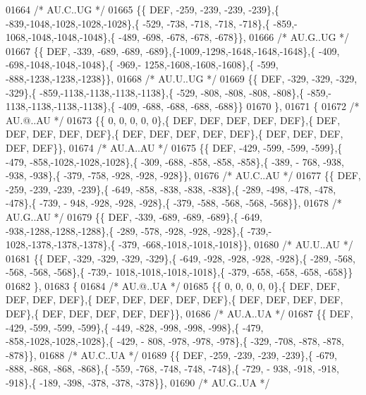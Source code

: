 \begin{DoxyCode}
01664 \textcolor{comment}{/* AU.C..UG */}
01665 \{\{  DEF, -259, -239, -239, -239\},\{ -839,-1048,-1028,-1028,-1028\},\{ -529, -738, -718, -718, -718\},\{ -859,-
      1068,-1048,-1048,-1048\},\{ -489, -698, -678, -678, -678\}\},
01666 \textcolor{comment}{/* AU.G..UG */}
01667 \{\{  DEF, -339, -689, -689, -689\},\{-1009,-1298,-1648,-1648,-1648\},\{ -409, -698,-1048,-1048,-1048\},\{ -969,-
      1258,-1608,-1608,-1608\},\{ -599, -888,-1238,-1238,-1238\}\},
01668 \textcolor{comment}{/* AU.U..UG */}
01669 \{\{  DEF, -329, -329, -329, -329\},\{ -859,-1138,-1138,-1138,-1138\},\{ -529, -808, -808, -808, -808\},\{ -859,-
      1138,-1138,-1138,-1138\},\{ -409, -688, -688, -688, -688\}\}
01670 \},
01671 \{
01672 \textcolor{comment}{/* AU.@..AU */}
01673 \{\{    0,    0,    0,    0,    0\},\{  DEF,  DEF,  DEF,  DEF,  DEF\},\{  DEF,  DEF,  DEF,  DEF,  DEF\},\{  DEF,  
      DEF,  DEF,  DEF,  DEF\},\{  DEF,  DEF,  DEF,  DEF,  DEF\}\},
01674 \textcolor{comment}{/* AU.A..AU */}
01675 \{\{  DEF, -429, -599, -599, -599\},\{ -479, -858,-1028,-1028,-1028\},\{ -309, -688, -858, -858, -858\},\{ -389, -
      768, -938, -938, -938\},\{ -379, -758, -928, -928, -928\}\},
01676 \textcolor{comment}{/* AU.C..AU */}
01677 \{\{  DEF, -259, -239, -239, -239\},\{ -649, -858, -838, -838, -838\},\{ -289, -498, -478, -478, -478\},\{ -739, -
      948, -928, -928, -928\},\{ -379, -588, -568, -568, -568\}\},
01678 \textcolor{comment}{/* AU.G..AU */}
01679 \{\{  DEF, -339, -689, -689, -689\},\{ -649, -938,-1288,-1288,-1288\},\{ -289, -578, -928, -928, -928\},\{ -739,-
      1028,-1378,-1378,-1378\},\{ -379, -668,-1018,-1018,-1018\}\},
01680 \textcolor{comment}{/* AU.U..AU */}
01681 \{\{  DEF, -329, -329, -329, -329\},\{ -649, -928, -928, -928, -928\},\{ -289, -568, -568, -568, -568\},\{ -739,-
      1018,-1018,-1018,-1018\},\{ -379, -658, -658, -658, -658\}\}
01682 \},
01683 \{
01684 \textcolor{comment}{/* AU.@..UA */}
01685 \{\{    0,    0,    0,    0,    0\},\{  DEF,  DEF,  DEF,  DEF,  DEF\},\{  DEF,  DEF,  DEF,  DEF,  DEF\},\{  DEF,  
      DEF,  DEF,  DEF,  DEF\},\{  DEF,  DEF,  DEF,  DEF,  DEF\}\},
01686 \textcolor{comment}{/* AU.A..UA */}
01687 \{\{  DEF, -429, -599, -599, -599\},\{ -449, -828, -998, -998, -998\},\{ -479, -858,-1028,-1028,-1028\},\{ -429, -
      808, -978, -978, -978\},\{ -329, -708, -878, -878, -878\}\},
01688 \textcolor{comment}{/* AU.C..UA */}
01689 \{\{  DEF, -259, -239, -239, -239\},\{ -679, -888, -868, -868, -868\},\{ -559, -768, -748, -748, -748\},\{ -729, -
      938, -918, -918, -918\},\{ -189, -398, -378, -378, -378\}\},
01690 \textcolor{comment}{/* AU.G..UA */}

\end{DoxyCode}

